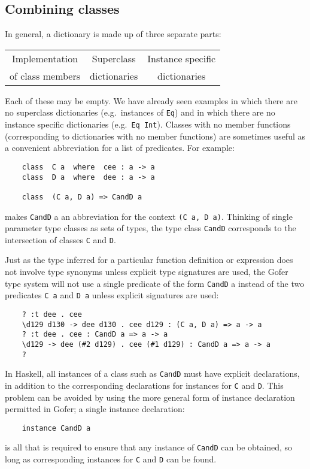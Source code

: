 \subsection{Combining classes}
In general, a dictionary is made up of three separate parts:
\BQ
\begin{tabular}{|c|c|c|}
\hline
Implementation   & Superclass   & Instance specific \\
of class members & dictionaries & dictionaries \\
\hline
\end{tabular}
\EQ
%
Each of these may be empty.  We have already  seen  examples  in  which
there are no superclass dictionaries (e.g.\ instances  of  \verb"Eq")  and  in
which there are no  instance  specific  dictionaries  (e.g.\  \verb"Eq Int").
Classes with no member functions (corresponding to dictionaries with no
member functions) are sometimes useful as a convenient abbreviation for
a list of predicates.  For example:
\begin{verbatim}
    class  C a  where  cee : a -> a
    class  D a  where  dee : a -> a

    class  (C a, D a) => CandD a
\end{verbatim}
makes \verb"CandD" a an abbreviation for the context \verb"(C a, D a)".  
Thinking  of
single parameter type classes as sets of types, the  type  class  \verb"CandD"
corresponds to the intersection of classes \verb"C" and \verb"D".

Just as the type inferred  for  a  particular  function  definition  or
expression does not involve type synonyms unless explicit type signatures
are used, the Gofer type system will not use a single predicate of  the
form \verb"CandD" a instead of the two predicates \verb"C a" 
and \verb"D a" unless  explicit
signatures are used:
\begin{verbatim}
    ? :t dee . cee
    \d129 d130 -> dee d130 . cee d129 : (C a, D a) => a -> a
    ? :t dee . cee : CandD a => a -> a
    \d129 -> dee (#2 d129) . cee (#1 d129) : CandD a => a -> a
    ?
\end{verbatim}
In Haskell, all instances of  a  class  such  as  \verb"CandD"  must  have
explicit declarations, in addition to  the  corresponding  declarations
for instances for \verb"C" and \verb"D".  
This problem can be avoided  by  using  the
more general form of instance declaration permitted in Gofer; a  single
instance declaration:
\begin{verbatim}
    instance CandD a
\end{verbatim}
is all that is required to ensure that any instance  of  \verb"CandD"  can  be
obtained, so long as corresponding instances for \verb"C" and \verb"D" 
can be found.


